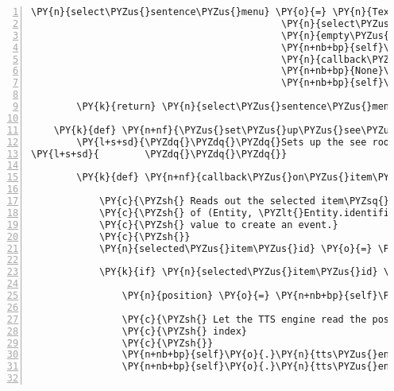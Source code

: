 \begin{Verbatim}[commandchars=\\\{\},numbers=left,firstnumber=1,stepnumber=1]
        \PY{n}{select\PYZus{}sentence\PYZus{}menu} \PY{o}{=} \PY{n}{TextMenuList}\PY{p}{(}\PY{p}{[}\PY{p}{]}\PY{p}{,}
                                            \PY{n}{select\PYZus{}sentence\PYZus{}sound}\PY{p}{,}
                                            \PY{n}{empty\PYZus{}sentences\PYZus{}menu\PYZus{}sound}\PY{p}{,}
                                            \PY{n+nb+bp}{self}\PY{o}{.}\PY{n}{channel\PYZus{}system}\PY{p}{,}
                                            \PY{n}{callback\PYZus{}on\PYZus{}sentence\PYZus{}selected}\PY{p}{,}
                                            \PY{n+nb+bp}{None}\PY{p}{,}
                                            \PY{n+nb+bp}{self}\PY{o}{.}\PY{n}{tts\PYZus{}engine}\PY{p}{)}

        \PY{k}{return} \PY{n}{select\PYZus{}sentence\PYZus{}menu}

    \PY{k}{def} \PY{n+nf}{\PYZus{}set\PYZus{}up\PYZus{}see\PYZus{}room\PYZus{}menu}\PY{p}{(}\PY{n+nb+bp}{self}\PY{p}{)}\PY{p}{:}
        \PY{l+s+sd}{\PYZdq{}\PYZdq{}\PYZdq{}Sets up the see room entities menu list.}
\PY{l+s+sd}{        \PYZdq{}\PYZdq{}\PYZdq{}}

        \PY{k}{def} \PY{n+nf}{callback\PYZus{}on\PYZus{}item\PYZus{}in\PYZus{}room\PYZus{}selected}\PY{p}{(}\PY{n}{see\PYZus{}room\PYZus{}menu}\PY{p}{)}\PY{p}{:}

            \PY{c}{\PYZsh{} Reads out the selected item\PYZsq{}s location, selected item is a tuple}
            \PY{c}{\PYZsh{} of (Entity, \PYZlt{}Entity.identifier|location\PYZgt{}) and we need the second}
            \PY{c}{\PYZsh{} value to create an event.}
            \PY{c}{\PYZsh{}}
            \PY{n}{selected\PYZus{}item\PYZus{}id} \PY{o}{=} \PY{n}{see\PYZus{}room\PYZus{}menu}\PY{o}{.}\PY{n}{list}\PY{p}{[}\PY{n}{see\PYZus{}room\PYZus{}menu}\PY{o}{.}\PY{n}{list\PYZus{}index}\PY{p}{]}\PY{p}{[}\PY{l+m+mi}{1}\PY{p}{]}

            \PY{k}{if} \PY{n}{selected\PYZus{}item\PYZus{}id} \PY{o+ow}{in} \PY{n+nb+bp}{self}\PY{o}{.}\PY{n}{host}\PY{o}{.}\PY{n}{room}\PY{o}{.}\PY{n}{entity\PYZus{}locations}\PY{o}{.}\PY{n}{keys}\PY{p}{(}\PY{p}{)}\PY{p}{:}

                \PY{n}{position} \PY{o}{=} \PY{n+nb+bp}{self}\PY{o}{.}\PY{n}{host}\PY{o}{.}\PY{n}{room}\PY{o}{.}\PY{n}{entity\PYZus{}locations}\PY{p}{[}\PY{n}{selected\PYZus{}item\PYZus{}id}\PY{p}{]}

                \PY{c}{\PYZsh{} Let the TTS engine read the position of the entity at current}
                \PY{c}{\PYZsh{} index}
                \PY{c}{\PYZsh{}}
                \PY{n+nb+bp}{self}\PY{o}{.}\PY{n}{tts\PYZus{}engine}\PY{o}{.}\PY{n}{say}\PY{p}{(}\PY{n}{position}\PY{p}{)}
                \PY{n+nb+bp}{self}\PY{o}{.}\PY{n}{tts\PYZus{}engine}\PY{o}{.}\PY{n}{runAndWait}\PY{p}{(}\PY{p}{)}


\end{Verbatim}
